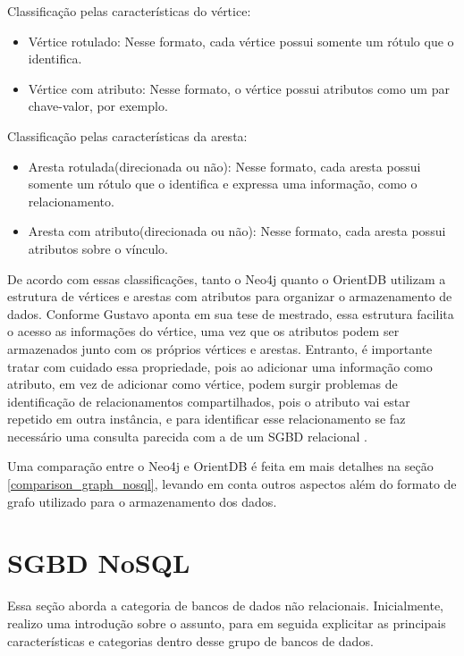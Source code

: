 	Classificação pelas características do vértice:
\begin{itemize}
		\item Vértice rotulado: Nesse formato, cada vértice possui somente um rótulo que o identifica.
		\item Vértice com atributo: Nesse formato, o vértice possui atributos como um par chave-valor, por exemplo.
\end{itemize}

	Classificação pelas características da aresta:
\begin{itemize}
		\item Aresta rotulada(direcionada ou não): Nesse formato, cada aresta possui somente um rótulo que o identifica e expressa uma informação, como o relacionamento.
		\item Aresta com atributo(direcionada ou não): Nesse formato, cada aresta possui atributos sobre o vínculo.
\end{itemize}

	De acordo com essas classificações, tanto o Neo4j quanto o OrientDB utilizam a estrutura de vértices e arestas com atributos para organizar o armazenamento de dados. Conforme Gustavo \cite{mdgnosql} aponta em sua tese de mestrado, essa estrutura facilita o acesso as informações do vértice, uma vez que os atributos podem ser armazenados junto com os próprios vértices e arestas. Entranto, é importante tratar com cuidado essa propriedade, pois ao adicionar uma informação como atributo, em vez de adicionar como vértice, podem surgir problemas de identificação de relacionamentos compartilhados, pois o atributo vai estar repetido em outra instância, e para identificar esse relacionamento se faz necessário uma consulta parecida com a de um SGBD relacional \cite{mdgnosql}.
	
	Uma comparação entre o Neo4j e OrientDB é feita em mais detalhes na seção \ref{comparison_graph_nosql}, levando em conta outros aspectos além do formato de grafo utilizado para o armazenamento dos dados.
	
\section{SGBD NoSQL}
	Essa seção aborda a categoria de bancos de dados não relacionais. Inicialmente, realizo uma introdução sobre o assunto, para em seguida explicitar as principais características e categorias dentro desse grupo de bancos de dados.
	
